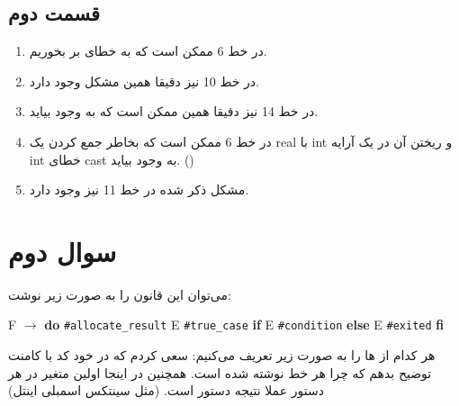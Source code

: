\documentclass[]{article}
\begin{document}
\subsection*{قسمت دوم}
\begin{enumerate}
    \item در خط 6 ممکن است که به خطای  بر بخوریم.
    \item در خط 10 نیز دقیقا همین مشکل وجود دارد.
    \item در خط 14 نیز دقیقا همین  ممکن است که به وجود بیاید.
    \item در خط 6 ممکن است که بخاطر جمع کردن یک real با int و ریختن آن در یک آرایه int خطای cast به وجود بیاید. ()
    \item مشکل ذکر شده در خط 11 نیز وجود دارد.
\end{enumerate}
\section*{سوال دوم}
می‌توان این قانون را به صورت زیر نوشت:
\begin{latin}
    \centering
    F $\rightarrow$ \textbf{do} \texttt{\#allocate\_result} E \texttt{\#true\_case} \textbf{if} E \texttt{\#condition} \textbf{else} E \texttt{\#exited} \textbf{fi}
\end{latin}
هر کدام از
ها
را به صورت زیر تعریف می‌کنیم:
سعی کردم که در خود کد با کامنت توضیح بدهم که چرا هر خط نوشته شده است. همچنین در اینجا اولین
متغیر در هر دستور عملا نتیجه دستور است. (مثل سینتکس اسمبلی اینتل)
\end{document}
